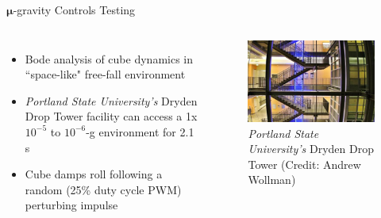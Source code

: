\documentclass[slidestop,compress]{beamer}
\begin{document}
\begin{frame}[plain]
\begin{block}{\vspace{0.5 cm}

\centering $\pmb \mu$-gravity Controls Testing}
\begin{columns}
\begin{itemize}
\item Bode analysis of cube dynamics in ``space-like" free-fall environment
\item {\it Portland State University's} Dryden Drop Tower facility can access a 1x$10^{-5}$ to $10^{-6}$-g environment for 2.1 s
\item Cube damps roll following a random (25\% duty cycle PWM) perturbing impulse\\

\end{itemize}
\begin{figure}[!ht]
\centering
{\includegraphics[width=0.9\linewidth]{MCHS-NASA-2016_03.jpg}
\caption{{\it Portland State University's} Dryden Drop Tower (Credit: Andrew Wollman)}

\vspace{0.5 cm}
} 
\end{figure}
\end{columns}
\end{block}    
\end{frame}
\end{document}
